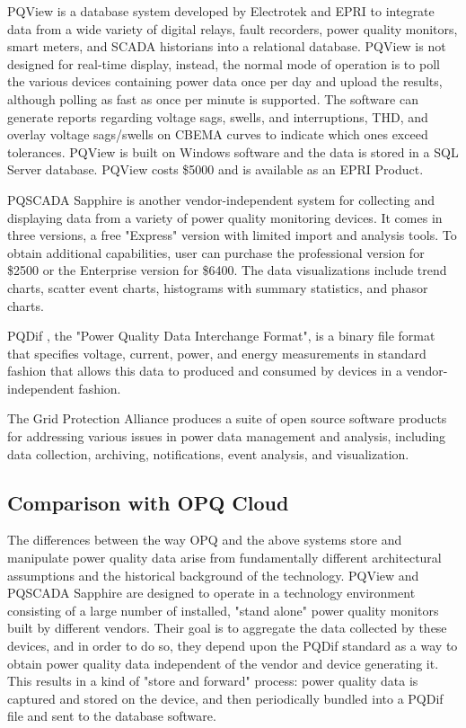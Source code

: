 PQView \cite{electrotek_concepts_pqview_2020} is a database system developed by Electrotek and EPRI to integrate data from a wide variety of digital relays, fault recorders, power quality monitors, smart meters, and SCADA historians into a relational database. PQView is not designed for real-time display, instead, the normal mode of operation is to poll the various devices containing power data once per day and upload the results, although polling as fast as once per minute is supported. The software can generate reports regarding voltage sags, swells, and interruptions, THD, and overlay voltage sags/swells on CBEMA curves to indicate which ones exceed tolerances. PQView is built on Windows software and the data is stored in a SQL Server database. PQView costs \$5000 and is available as an EPRI Product.

PQSCADA Sapphire \cite{elspec_ltd_pqscada_2016} is another vendor-independent system for collecting and displaying data from a variety of power quality monitoring devices. It comes in three versions, a free "Express" version with limited import and analysis tools. To obtain additional capabilities, user can purchase the professional version for \$2500 or the Enterprise version for \$6400. The data visualizations include trend charts, scatter event charts, histograms with summary statistics, and phasor charts.

PQDif \cite{sabin_ieee_2020}, the "Power Quality Data Interchange Format", is a binary file format that specifies voltage, current, power, and energy measurements in standard fashion that allows this data to produced and consumed by devices in a vendor-independent fashion.

The Grid Protection Alliance \cite{grid_protection_alliance_grid_2020} produces a suite of open source software products for addressing various issues in power data management and analysis, including data collection, archiving, notifications, event analysis, and visualization.

\subsection*{Comparison with OPQ Cloud}

The differences between the way OPQ and the above systems store and manipulate power quality data arise from fundamentally different architectural assumptions and the historical background of the technology. PQView and PQSCADA Sapphire are designed to operate in a technology environment consisting of a large number of installed, "stand alone" power quality monitors built by different vendors. Their goal is to aggregate the data collected by these devices, and in order to do so, they depend upon the PQDif standard as a way to obtain power quality data independent of the vendor and device generating it. This results in a kind of "store and forward" process: power quality data is captured and stored on the device, and then periodically bundled into a PQDif file and sent to the database software.

